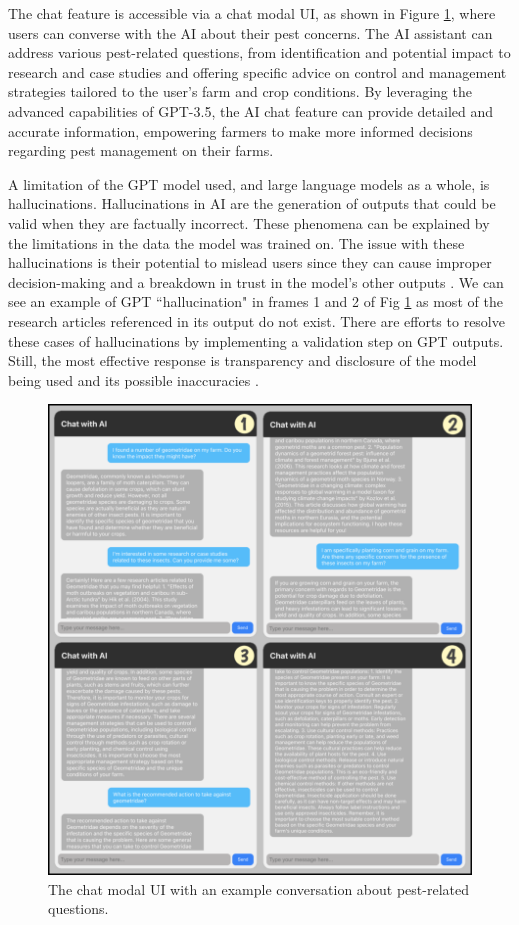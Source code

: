 The chat feature is accessible via a chat modal UI, as shown in Figure \ref{fig:4.8}, where users can converse with the AI about their pest concerns. The AI assistant can address various pest-related questions, from identification and potential impact to research and case studies and offering specific advice on control and management strategies tailored to the user's farm and crop conditions. By leveraging the advanced capabilities of GPT-3.5, the AI chat feature can provide detailed and accurate information, empowering farmers to make more informed decisions regarding pest management on their farms.

A limitation of the GPT model used, and large language models as a whole, is hallucinations. Hallucinations in AI are the generation of outputs that could be valid when they are factually incorrect. These phenomena can be explained by the limitations in the data the model was trained on. The issue with these hallucinations is their potential to mislead users since they can cause improper decision-making and a breakdown in trust in the model's other outputs \cite{gungor_2023}. We can see an example of GPT ``hallucination" in frames 1 and 2 of Fig \ref{fig:4.8} as most of the research articles referenced in its output do not exist. There are efforts to resolve these cases of hallucinations by implementing a validation step on GPT outputs. Still, the most effective response is transparency and disclosure of the model being used and its possible inaccuracies \cite{alkaissi_mcfarlane_2023}.

\begin{figure}[H]
\begin{center}
\includegraphics[width=1.0\linewidth]{Honors_Thesis/Figures/4.8.png}
\end{center}
\caption{The chat modal UI with an example conversation about pest-related questions.}
\label{fig:4.8}
\end{figure}

